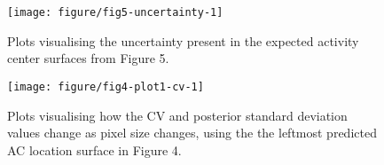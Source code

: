 \documentclass[10pt,a4paper]{article}\usepackage[]{graphicx}\usepackage[]{xcolor}
\makeatletter
\def\maxwidth{ %
  \ifdim\Gin@nat@width>\linewidth
    \linewidth
  \else
    \Gin@nat@width
  \fi
}
\newenvironment{knitrout}{}{} %
\makeatother
\begin{document}
\begin{knitrout}
\color{fgcolor}\begin{figure}
\texttt{[image: figure/fig5-uncertainty-1]} \caption[Plots visualising the uncertainty present in the expected activity center surfaces from Figure 5]{Plots visualising the uncertainty present in the expected activity center surfaces from Figure 5.}\label{fig:fig5-uncertainty}
\end{figure}

\end{knitrout}

\begin{knitrout}
\color{fgcolor}\begin{figure}
\texttt{[image: figure/fig4-plot1-cv-1]} \caption[Plots visualising how the CV and posterior standard deviation values change as pixel size changes, using the the leftmost predicted AC location surface in Figure 4]{Plots visualising how the CV and posterior standard deviation values change as pixel size changes, using the the leftmost predicted AC location surface in Figure 4.}\label{fig:fig4-plot1-cv}
\end{figure}

\end{knitrout}



\end{document}
